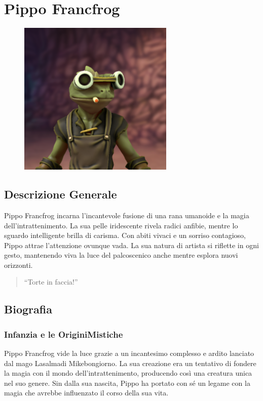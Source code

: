 \section{Pippo Francfrog}\label{pippo-francfrog}


\begin{figure}
\centering
\includegraphics{Pippo_Francfrog-Token.png}
\end{figure}

\subsection{Descrizione Generale}\label{descrizione-generale}



Pippo Francfrog incarna l'incantevole fusione di una rana umanoide e la
magia dell'intrattenimento. La sua pelle iridescente rivela radici
anfibie, mentre lo sguardo intelligente brilla di carisma. Con abiti
vivaci e un sorriso contagioso, Pippo attrae l'attenzione ovunque vada.
La sua natura di artista si riflette in ogni gesto, mantenendo viva la
luce del palcoscenico anche mentre esplora nuovi orizzonti.

\begin{quote}
``Torte in faccia!''
\end{quote}

\subsection{Biografia}\label{biografia}


\subsubsection{Infanzia e le OriginiMistiche}\label{infanzia-e-le-origini-mistiche}
Pippo Francfrog vide la luce grazie a un incantesimo complesso e ardito
lanciato dal mago Lasalmadi Mikebongiorno. La sua creazione era un
tentativo di fondere la magia con il mondo dell'intrattenimento,
producendo così una creatura unica nel suo genere. Sin dalla sua
nascita, Pippo ha portato con sé un legame con la magia che avrebbe
influenzato il corso della sua vita.

